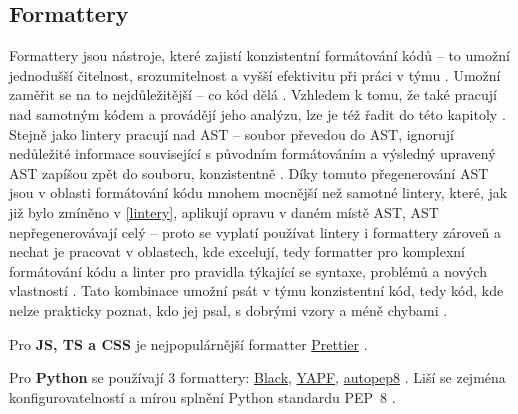 \subsection{Formattery}

Formattery jsou nástroje, které zajistí konzistentní formátování kódů  -- to umožní jednodušší čitelnost, srozumitelnost a vyšší efektivitu při práci v týmu \cite{linter-medium1}. Umožní zaměřit se na to nejdůležitější -- co kód dělá \cite{linter-restishistory}. Vzhledem k tomu, že také pracují nad samotným kódem a provádějí jeho analýzu, lze je též řadit do této kapitoly \cite{linter-medium1}. Stejně jako lintery pracují nad AST -- soubor převedou do AST, ignorují nedůležité informace související s původním formátováním a výsledný upravený AST zapíšou zpět do souboru, konzistentně \cite{linter-medium1}. Díky tomuto přegenerování AST jsou v oblasti formátování kódu mnohem mocnější než samotné lintery, které, jak již bylo zmíněno v \ref{lintery}, aplikují opravu v daném místě AST, AST nepřegenerovávají celý -- proto se vyplatí používat lintery i formattery zároveň a nechat je pracovat v oblastech, kde excelují, tedy formatter pro komplexní formátování kódu a linter pro pravidla týkající se syntaxe, problémů a nových vlastností  \cite{linter-medium2}. Tato kombinace umožní psát v týmu konzistentní kód, tedy kód, kde nelze prakticky poznat, kdo jej psal, s dobrými vzory a méně chybami \cite{linter-restishistory}.

Pro \textbf{JS, TS a CSS} je nejpopulárnější formatter \href{https://prettier.io/}{Prettier} \cite{linter-medium1}. 

Pro \textbf{Python} se používají 3 formattery: \href{https://github.com/psf/black}{Black}, \href{https://github.com/google/yapf}{YAPF}, \href{https://github.com/hhatto/autopep8}{autopep8} \cite{formatter-python, linter-realpython}. Liší se zejména konfigurovatelností a mírou splnění Python standardu PEP~8 \cite{linter-realpython}.

